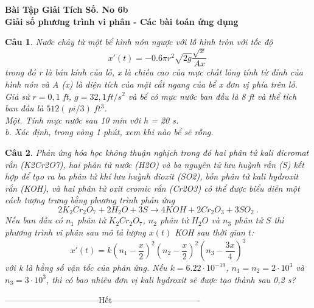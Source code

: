 \documentclass[11pt]{article}
\newtheorem{bt}{Câu}
\begin{document}


\begin{center}
	{\bf Bài Tập Giải Tích Số. No 6b \\ Giải số phương trình vi phân - Các bài toán ứng dụng}
\end{center}


\begin{bt}
Nước chảy từ một bể hình nón ngược với lỗ hình tròn với tốc độ
%
\[
x'(t) = - 0.6 \pi r^2 \sqrt{2g} \dfrac{\sqrt{x}}{Ax} \,
\]
%
trong đó r là bán kính của lỗ, x là chiều cao của mực chất lỏng tính từ đỉnh của hình nón và A (x) là diện tích của mặt cắt ngang của bể x đơn vị phía trên lỗ. Giả sử $ r = 0,1 $ ft, $ g = 32,1 ft / s ^ 2 $ và bể có mực nước ban đầu là 8 ft và thể tích ban đầu là $ 512 (\ pi / 3) \ ft ^ 3 $. \\
Một. Tính mực nước sau 10 min với h = 20 s. \\
b. Xác định, trong vòng 1 phút, xem khi nào bể sẽ rỗng.
\end{bt}

\begin{bt}
Phản ứng hóa học không thuận nghịch trong đó hai phân tử kali đicromat rắn (K2Cr2O7), hai phân tử nước (H2O) và ba nguyên tử lưu huỳnh rắn (S) kết hợp để tạo ra ba phân tử khí lưu huỳnh đioxit (SO2), bốn phân tử kali hydroxit rắn (KOH), và hai phân tử oxit cromic rắn (Cr2O3) có thể được biểu diễn một cách tượng trưng bằng phương trình phản ứng
%
\begin{equation}
2K_2Cr_2O_7 + 2H_2O + 3S \rightarrow 4KOH + 2Cr_2O_3 + 3SO_2 \ .
\end{equation}
%
Nếu ban đầu có $ n_1 $ phân tử $ K_2Cr_2O_7 $, $ n_2 $ phân tử $ H_2O $ và $ n_3 $ phân tử $ S $ thì phương trình vi phân sau mô tả lượng $x(t)$ KOH sau thời gian $t$:
%
\[
x'(t) = k \left( n_1 - \dfrac{x}{2} \right)^2 \left( n_2 - \dfrac{x}{2} \right)^2  \left( n_3 - \dfrac{3x}{4} \right)^3 
\]
%
với k là hằng số vận tốc của phản ứng. Nếu $ k = 6.22 \cdot 10^{- 19} $, $ n_1 = n_2 = 2 \cdot 10^3 $ và $ n_3 = 3 \cdot 10 ^ 3 $, thì có bao nhiêu đơn vị kali hydroxit sẽ được tạo thành sau 0,2 s?
\end{bt}

\centerline{———————————Hết——————————-}
\end{document}
